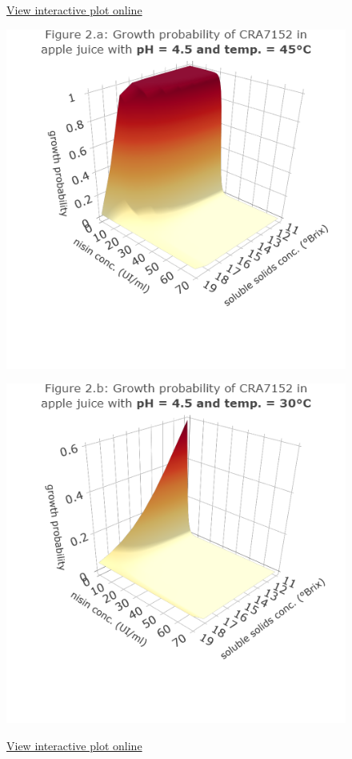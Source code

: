\documentclass[
  12pt,
]{article}
\begin{document}
\begin{figure}
\centering
\begin{minipage}{.5\textwidth}
  \centering
  \caption*{\hypersetup{urlcolor=blue}\href{https://chart-studio.plotly.com/~valentinoli/11/}{View interactive plot online}}
  \includegraphics[width=\linewidth]{fig2a}
  \label{fig2a}
\end{minipage}%
\begin{minipage}{.5\textwidth}
  \centering
  \caption*{\hypersetup{urlcolor=blue}\href{https://chart-studio.plotly.com/~valentinoli/13/}{View interactive plot online}}
  \includegraphics[width=\linewidth]{fig2b}
  \label{fig2b}
\end{minipage}
\end{figure}
\end{document}

